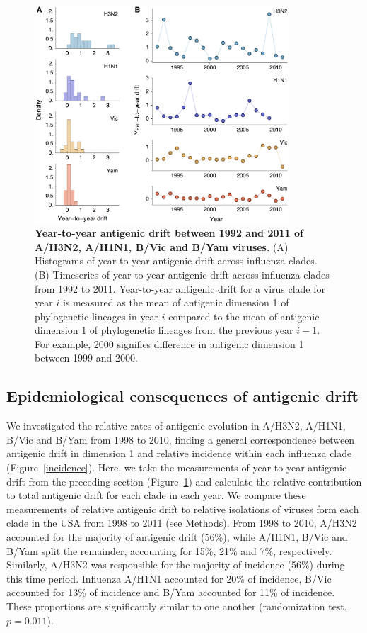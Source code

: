 \documentclass[11pt,oneside,letterpaper]{article}
\begin{document}
\begin{figure}[h]
	\centering		
	\includegraphics[width=0.85\textwidth]{figures/jumps}
	\caption{\textbf{Year-to-year antigenic drift between 1992 and 2011 of A/H3N2, A/H1N1, B/Vic and B/Yam viruses.} 
	(A) Histograms of year-to-year antigenic drift across influenza clades.
	(B) Timeseries of year-to-year antigenic drift across influenza clades from 1992 to 2011.
	Year-to-year antigenic drift for a virus clade for year $i$ is measured as the mean of antigenic dimension 1 of phylogenetic lineages in year $i$ compared to the mean of antigenic dimension 1 of phylogenetic lineages from the previous year $i-1$.
	For example, 2000 signifies difference in antigenic dimension 1 between 1999 and 2000.
	} 
	\label{jumps} 
\end{figure}

\subsection*{Epidemiological consequences of antigenic drift}

We investigated the relative rates of antigenic evolution in A/H3N2, A/H1N1, B/Vic and B/Yam from 1998 to 2010, finding a general correspondence between antigenic drift in dimension 1 and relative incidence within each influenza clade (Figure~\ref{incidence}).
Here, we take the measurements of year-to-year antigenic drift from the preceding section (Figure~\ref{jumps}) and calculate the relative contribution to total antigenic drift for each clade in each year.
We compare these measurements of relative antigenic drift to relative isolations of viruses form each clade in the USA from 1998 to 2011 (see Methods).
From 1998 to 2010, A/H3N2 accounted for the majority of antigenic drift (56\%), while A/H1N1, B/Vic and B/Yam split the remainder, accounting for 15\%, 21\% and 7\%, respectively.
Similarly, A/H3N2 was responsible for the majority of incidence (56\%) during this time period.
Influenza A/H1N1 accounted for 20\% of incidence, B/Vic accounted for 13\% of incidence and B/Yam accounted for 11\% of incidence.
These proportions are significantly similar to one another (randomization test, $p = 0.011$).
\end{document}
